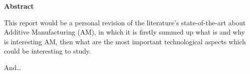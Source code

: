 \thispagestyle{empty}
\begin{center}
\large\bfseries Abstract
\end{center}

This report would be a personal revision of the literature's state-of-the-art about Additive Manufacturing (AM), in which it is firstly summed up what is and why is interesting AM, then what are the most important technological aspects which could be interesting to study.

And\ldots
\cleardoublepage